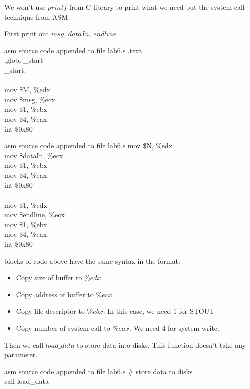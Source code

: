 \documentclass{article}
\begin{document}
We won't use $printf$ from C library to print what we need but the system call technique from ASM
\begin{multicols}{2}
First print out $msg$, $dataIn$, $endline$
\begin{GFT}{asm source code appended to file lab6.s}
\+.text\\
\+.globl \_start\\
\+\_start:\\
\+\\
\+mov \$M, \%edx\\
\+mov \$msg, \%ecx\\
\+mov \$1, \%ebx\\
\+mov \$4, \%eax\\
\+int \$0x80\\
\end{GFT}
\columnbreak
\begin{GFT}{asm source code appended to file lab6.s}
\+mov \$N, \%edx\\
\+mov \$dataIn, \%ecx\\
\+mov \$1, \%ebx\\
\+mov \$4, \%eax\\
\+int \$0x80\\
\+\\
\+mov \$1, \%edx\\
\+mov \$endline, \%ecx\\
\+mov \$1, \%ebx\\
\+mov \$4, \%eax\\
\+int \$0x80\\
\end{GFT}
\end{multicols}
 blocks of code above have the same syntax in the format:
\begin{itemize}
\item Copy size of buffer to $\%edx$
\item Copy address of buffer to $\%ecx$
\item Copy file descriptor to $\%ebx$. In this case, we need $1$ for STOUT
\item Copy number of system call to $\%eax$. We need $4$ for system write.
\end{itemize}
Then we call $load\_data$ to store data into disks. This function doesn't take any parameter.
\begin{GFT}{asm source code appended to file lab6.s}
\+\# store data to disks\\
\+call load\_data\\
\end{GFT}
\end{document}
